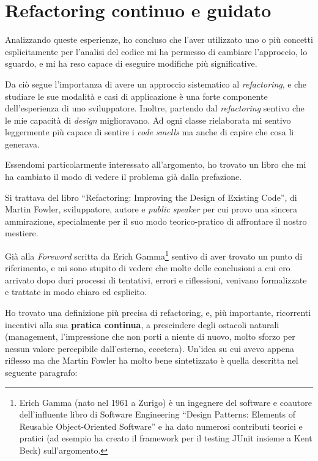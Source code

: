 \documentclass[12pt]{report}
\begin{document}
%
%
%
%
\chapter{Refactoring continuo e guidato}
\label{cap:refactoring_continuo}

Analizzando queste esperienze, ho concluso che l'aver utilizzato uno o più
concetti esplicitamente per l'analisi del codice mi ha permesso di
cambiare l'approccio, lo sguardo, e mi ha reso capace di eseguire
modifiche più significative.

Da ciò segue l'importanza di avere un approccio sistematico al 
\textit{refactoring}, e che studiare le sue modalità e casi di applicazione
è una forte componente dell'esperienza di uno sviluppatore. Inoltre, partendo
dal \textit{refactoring} sentivo che le mie capacità di \textit{design}
miglioravano. Ad ogni classe rielaborata mi sentivo leggermente più
capace di sentire i \textit{code smells} ma anche di capire 
che cosa li generava.

Essendomi particolarmente interessato all'argomento, ho trovato un libro 
che mi ha cambiato il modo di vedere il problema già dalla prefazione.

Si trattava del libro ``Refactoring: Improving the Design of
Existing Code''\cite{fowler2002}, di Martin Fowler, sviluppatore, 
autore e \textit{public speaker} per cui provo una sincera ammirazione,
specialmente per il suo modo teorico-pratico di affrontare il nostro
mestiere. 

Già alla \textit{Foreword} scritta da Erich Gamma\footnote{
Erich Gamma (nato nel 1961 a Zurigo) è un ingegnere del software e
coautore dell'influente libro di Software Engineering ``Design Patterns: 
Elements of Reusable Object-Oriented Software'' e ha dato numerosi contributi
teorici e pratici (ad esempio ha creato il framework per il testing 
JUnit insieme a Kent Beck) sull'argomento.
}
sentivo di aver trovato un punto di riferimento, e mi sono stupito di
vedere che molte delle conclusioni a cui ero arrivato dopo
duri processi di tentativi, errori e riflessioni, venivano formalizzate
e trattate in modo chiaro ed esplicito.

Ho trovato una definizione più precisa di refactoring, e, più importante, 
ricorrenti incentivi alla sua 
\textbf{pratica continua}, a prescindere degli ostacoli naturali (management, 
l'impressione che non porti a niente di nuovo, molto sforzo per nessun valore
percepibile dall'esterno, eccetera). Un'idea su cui avevo appena riflesso
ma che Martin Fowler ha molto bene sintetizzato è quella descritta nel
seguente paragrafo:
\end{document}
